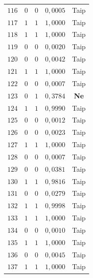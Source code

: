 \begin{longtable}{ccccc}
    $116$ & $0$ & $0$ & $0{,}0005$ & Taip \\
    $117$ & $1$ & $1$ & $1{,}0000$ & Taip \\
    $118$ & $1$ & $1$ & $1{,}0000$ & Taip \\
    $119$ & $0$ & $0$ & $0{,}0020$ & Taip \\
    $120$ & $0$ & $0$ & $0{,}0042$ & Taip \\
    $121$ & $1$ & $1$ & $1{,}0000$ & Taip \\
    $122$ & $0$ & $0$ & $0{,}0007$ & Taip \\
    \rowcolor{pink} $123$ & $0$ & $1$ & $0{,}3784$ & \textbf{Ne} \\
    $124$ & $1$ & $1$ & $0{,}9990$ & Taip \\
    $125$ & $0$ & $0$ & $0{,}0012$ & Taip \\
    $126$ & $0$ & $0$ & $0{,}0023$ & Taip \\
    $127$ & $1$ & $1$ & $1{,}0000$ & Taip \\
    $128$ & $0$ & $0$ & $0{,}0007$ & Taip \\
    $129$ & $0$ & $0$ & $0{,}0381$ & Taip \\
    $130$ & $1$ & $1$ & $0{,}9816$ & Taip \\
    $131$ & $0$ & $0$ & $0{,}0279$ & Taip \\
    $132$ & $1$ & $1$ & $0{,}9998$ & Taip \\
    $133$ & $1$ & $1$ & $1{,}0000$ & Taip \\
    $134$ & $0$ & $0$ & $0{,}0010$ & Taip \\
    $135$ & $1$ & $1$ & $1{,}0000$ & Taip \\
    $136$ & $0$ & $0$ & $0{,}0045$ & Taip \\
    $137$ & $1$ & $1$ & $1{,}0000$ & Taip \\
\end{longtable}